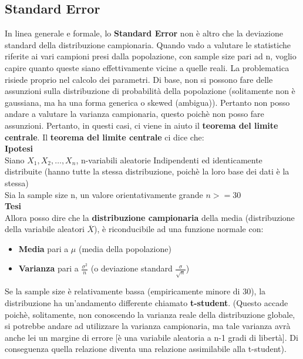 \subsection{Standard Error}
In linea generale e formale, lo \textbf{Standard Error} non è altro che la deviazione standard della distribuzione campionaria.
Quando vado a valutare le statistiche riferite ai vari campioni presi dalla popolazione, con sample size pari ad n, voglio capire quanto queste siano effettivamente vicine a quelle reali. La problematica risiede proprio nel calcolo dei parametri. Di base, non si possono fare delle assunzioni sulla distribuzione di probabilità della popolazione (solitamente non è gaussiana, ma ha una forma generica o skewed (ambigua)). Pertanto non posso andare a valutare la varianza campionaria, questo poichè non posso fare assunzioni. Pertanto, in questi casi, ci viene in aiuto il \textbf{teorema del limite centrale}.
Il \textbf{teorema del limite centrale} ci dice che:
\\\textbf{Ipotesi}\\
Siano \(X_1, X_2, \dots, X_n\), n-variabili aleatorie Indipendenti ed identicamente distribuite (hanno tutte la stessa distribuzione, poichè la loro base dei dati è la stessa)
\\
Sia la sample size n, un valore orientativamente grande \(n>=30\)
\\
\textbf{Tesi}
\\
Allora posso dire che la \textbf{distribuzione campionaria} della media (distribuzione della variabile aleatori \(\overline{X}\)), è riconducibile ad una funzione normale con:
\begin{itemize}
    \item \textbf{Media} pari a \(\mu\) (media della popolazione)
    \item \textbf{Varianza} pari a \(\frac{\sigma^2}{n}\) (o deviazione standard \(\frac{\sigma}{\sqrt n}\))
\end{itemize}
Se la sample size è relativamente bassa (empiricamente minore di 30), la distribuzione ha un'andamento differente chiamato \textbf{t-student}. (Questo accade poichè, solitamente, non conoscendo la varianza reale della distribuzione globale, si potrebbe andare ad utilizzare la varianza campionaria, ma tale varianza avrà anche lei un margine di errore [è una variabile aleatoria a n-1 gradi di libertà]. Di conseguenza quella relazione diventa una relazione assimilabile alla t-student).

